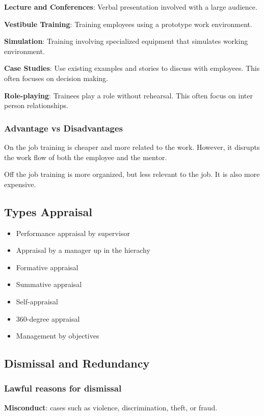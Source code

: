 \documentclass{standalone}
\begin{document}
\textbf{Lecture and Conferences}: Verbal presentation involved with a large audience.

\textbf{Vestibule Training}: Training employees using a prototype work environment.

\textbf{Simulation}: Training involving specialized equipment that simulates working environment.

\textbf{Case Studies}: Use existing examples and stories to discuss with employees.
This often focuses on decision making.

\textbf{Role-playing}: Trainees play a role without rehearsal. 
This often focus on inter person relationships.

\subsubsection{Advantage vs Disadvantages}
On the job training is cheaper and more related to the work.
However, it disrupts the work flow of both the employee and the mentor.

Off the job training is more organized, but less relevant to the job.
It is also more expensive.

\subsection{Types Appraisal}
\begin{itemize}
	\item Performance appraisal by supervisor
	\item Appraisal by a manager up in the hierachy
	\item Formative appraisal
	\item Summative appraisal
	\item Self-appraisal
	\item 360-degree appraisal
	\item Management by objectives
\end{itemize}

\subsection{Dismissal and Redundancy}

\subsubsection{Lawful reasons for dismissal}
\textbf{Misconduct}: cases such as violence, discrimination, theft, or fraud.
\end{document}
